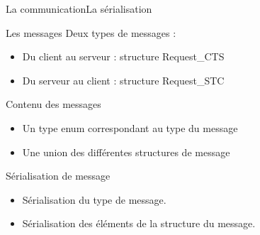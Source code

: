 \documentclass[french]{beamer}
\begin{document}
	    \begin{frame}{La communication}{La sérialisation}

	        \begin{block}{Les messages}
	            Deux types de messages :
	            \begin{itemize}
	                \item Du client au serveur : structure Request\_CTS
	                \item Du serveur au client : structure Request\_STC
	            \end{itemize}
	        \end{block}

	        \begin{block}{Contenu des messages}
	            \begin{itemize}
	                \item Un type enum correspondant au type du message
	                \item Une union des différentes structures de message
	            \end{itemize}
	        \end{block}

	        \begin{block}{Sérialisation de message}
	        	\begin{itemize}
	                \item Sérialisation du type de message.
	                \item Sérialisation des éléments de la structure du message.
	            \end{itemize}            
	        \end{block}
	    \end{frame}
\end{document}
